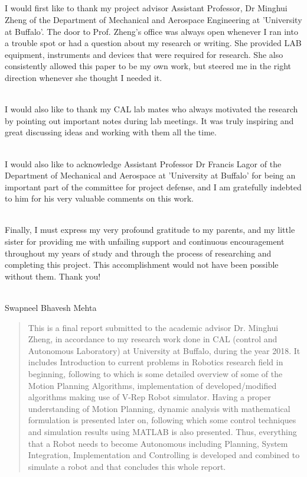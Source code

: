 \documentclass[12pt]{article}
\begin{document}
\begin{titlepage}
\section*{\centering{}}
I would first like to thank my project advisor Assistant Professor, Dr Minghui Zheng of the Department of Mechanical and Aerospace Engineering at 'University at Buffalo'. The door to Prof. Zheng's office was always open whenever I ran into a trouble spot or had a question about my research or writing. She provided LAB equipment, instruments and devices that were required for research. She also consistently allowed this paper to be my own work, but steered me in the right direction whenever she thought I needed it.\par \noindent \\
I would also like to thank my CAL lab mates who always motivated the research by pointing out important notes during lab meetings. It was truly inspiring and great discussing ideas and working with them all the time. \par \noindent \\
I would also like to acknowledge Assistant Professor Dr Francis Lagor of the Department of Mechanical and Aerospace at 'University at Buffalo' for being an important part of the committee for project defense, and I am gratefully indebted to him for his very valuable comments on this work.\par \noindent \\
Finally, I must express my very profound gratitude to my parents, and my little sister for providing me with unfailing support and continuous encouragement throughout my years of study and through the process of researching and completing this project. This accomplishment would not have been possible without them. Thank you!
\par
\par \noindent \\
Swapneel Bhavesh Mehta
\end{titlepage}
\newpage

\begin{abstract}
This is a final report submitted to the academic advisor Dr. Minghui Zheng, in accordance to my research work done in CAL (control and Autonomous Laboratory) at University at Buffalo, during the year 2018. It includes Introduction to current problems in Robotics research field in beginning, following to which is some detailed overview of some of the Motion Planning Algorithms, implementation of developed/modified algorithms making use of V-Rep Robot simulator. Having a proper understanding of Motion Planning, dynamic analysis with mathematical formulation is presented later on, following which some control techniques and simulation results using MATLAB is also presented. Thus, everything that a Robot needs to become Autonomous including Planning, System Integration, Implementation and Controlling is developed and combined to simulate a robot and that concludes this whole report.  
\end{abstract}
\newpage
\end{document}
